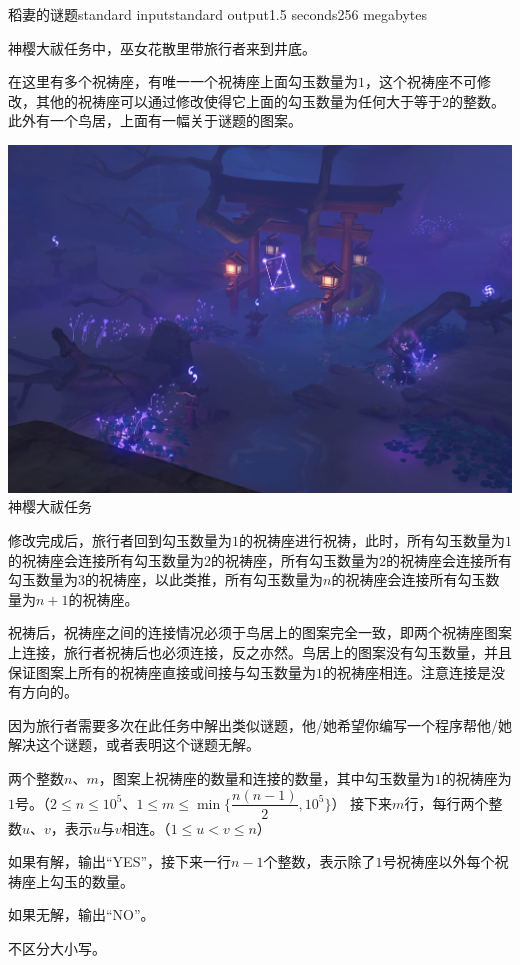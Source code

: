 \begin{problem}{稻妻的谜题}{standard input}{standard output}{1.5 seconds}{256 megabytes}

神樱大祓任务中，巫女花散里带旅行者来到井底。

在这里有多个祝祷座，有唯一一个祝祷座上面勾玉数量为$1$，这个祝祷座不可修改，其他的祝祷座可以通过修改使得它上面的勾玉数量为任何大于等于$2$的整数。此外有一个鸟居，上面有一幅关于谜题的图案。

\begin{center}
  \includegraphics[scale=0.25]{puzzle.jpg} \\
  \small{神樱大祓任务}
\end{center}

修改完成后，旅行者回到勾玉数量为$1$的祝祷座进行祝祷，此时，所有勾玉数量为$1$的祝祷座会连接所有勾玉数量为$2$的祝祷座，所有勾玉数量为$2$的祝祷座会连接所有勾玉数量为$3$的祝祷座，以此类推，所有勾玉数量为$n$的祝祷座会连接所有勾玉数量为$n + 1$的祝祷座。

祝祷后，祝祷座之间的连接情况必须于鸟居上的图案完全一致，即两个祝祷座图案上连接，旅行者祝祷后也必须连接，反之亦然。鸟居上的图案没有勾玉数量，并且保证图案上所有的祝祷座直接或间接与勾玉数量为$1$的祝祷座相连。注意连接是没有方向的。

因为旅行者需要多次在此任务中解出类似谜题，他/她希望你编写一个程序帮他/她解决这个谜题，或者表明这个谜题无解。

\InputFile
两个整数$n$、$m$，图案上祝祷座的数量和连接的数量，其中勾玉数量为$1$的祝祷座为$1$号。（$2 \le n \le 10^5$、$1 \le m \le \min {\{\dfrac{n(n - 1)}{2}, 10^5\}}$）
接下来$m$行，每行两个整数$u$、$v$，表示$u$与$v$相连。（$1 \le u < v \le n$）

\OutputFile
如果有解，输出``YES''，接下来一行$n - 1$个整数，表示除了$1$号祝祷座以外每个祝祷座上勾玉的数量。

如果无解，输出``NO''。

不区分大小写。

\Examples

\begin{example}
%
%
%
\end{example}

\end{problem}

